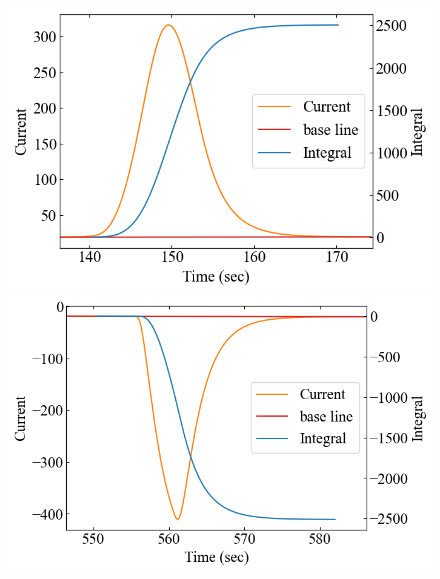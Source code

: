 \documentclass[9pt,dvipdfmx,a4paper]{jsarticle}
\begin{document}
\begin{figure}[hbt]
    \centering
    \begin{minipage}[t]{0.245\columnwidth}
        \centering
        \includegraphics[width = \columnwidth]{appendix/In-dHdt-heat.png}
    \end{minipage}
    \hfill
    \begin{minipage}[t]{0.245\columnwidth}
        \centering
        \includegraphics[width = \columnwidth]{appendix/In-dHdt-cool.png}
    \end{minipage}
    \hfill
    \begin{minipage}[t]{0.245\columnwidth}
        \centering

\end{minipage}
\end{figure}
\end{document}

